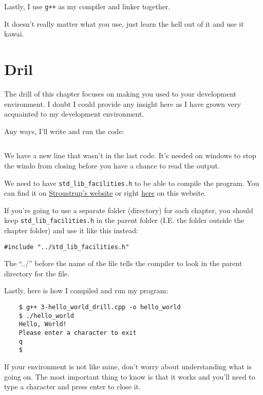 \documentclass{book}
\begin{document}
Lastly, I use \verb|g++| as my compiler and linker together.

It doesn't really matter what you use, just learn the hell out of it and use it kawai.

\section{Dril}
The drill of this chapter focuses on making you used to your development environment. I doubt I could provide any insight here as I have grown very acquainted to my development environment.

Any ways, I'll write and run the code:

\inputminted[linenos, frame=lines, fontsize=\small, tabsize=2]{c++}{./csc-201/3-hello_world_drill.cpp}

We have a new line that wasn't in the last code. It's needed on windows to stop the windo from closing before you have a chance to read the output.

We need to have \verb|std_lib_facilities.h| to be able to compile the program. You can find it on \href{https://stroustrup.com/std_lib_facilities.h}{Stroustrup's website} or right \href{./csc-201/std_lib_facilities.h}{here} on this website.

If you're going to use a separate folder (directory) for each chapter, you should keep \verb|std_lib_facilities.h| in the parent folder (I.E. the folder outside the chapter folder) and use it like this instead:

\begin{verbatim}
#include "../std_lib_facilities.h"
\end{verbatim}

The ``../'' before the name of the file tells the compiler to look in the parent directory for the file.

Lastly, here is how I compiled and run my program:

\begin{verbatim}
	$ g++ 3-hello_world_drill.cpp -o hello_world
	$ ./hello_world
	Hello, World!
	Please enter a character to exit
	q
	$
\end{verbatim}

If your environment is not like mine, don't worry about understanding what is going on. The most important thing to know is that it works and you'll need to type a character and press enter to close it.
\end{document}
